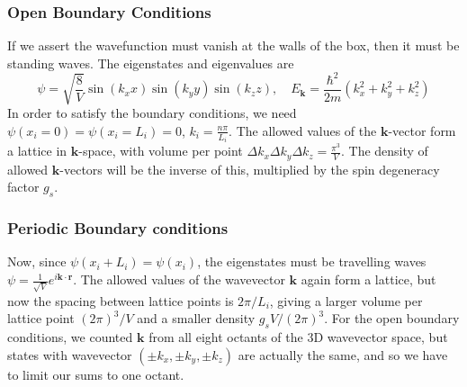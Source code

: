 \documentclass[a4paper]{article}
\theoremstyle{new}
\begin{document}
\subsubsection*{Open Boundary Conditions}
If we assert the wavefunction must vanish at the walls of the box, then it must be standing waves. The eigenstates and eigenvalues are
$$\psi=\sqrt{\frac{8}{V}}\sin(k_xx)\sin(k_yy)\sin(k_zz),\quad E_{\mathbf{k}}=\frac{\hbar^2}{2m}(k_x^2+k_y^2+k_z^2)$$
In order to satisfy the boundary conditions, we need $\psi(x_i=0)=\psi(x_i=L_i)=0$, $k_i=\frac{n\pi}{L_i}$. The allowed values of the $\mathbf{k}$-vector form a lattice in $\mathbf{k}$-space, with volume per point $\Delta k_x\Delta k_y\Delta k_z=\frac{\pi^3}{V}$. The density of allowed $\mathbf{k}$-vectors will be the inverse of this, multiplied by the spin degeneracy factor $g_s$.
\subsubsection*{Periodic Boundary conditions}
Now, since $\psi(x_i+L_i)=\psi(x_i)$, the eigenstates must be travelling waves $\psi=\frac{1}{\sqrt{V}}e^{i\mathbf{k}\cdot\mathbf{r}}$. The allowed values of the wavevector $\mathbf{k}$ again form a lattice, but now the spacing between lattice points is $2\pi/L_i$, giving a larger volume per lattice point $(2\pi)^3/V$ and a smaller density $g_sV/(2\pi)^3$. For the open boundary conditions, we counted $\mathbf{k}$ from all eight octants of the 3D wavevector space, but states with wavevector $(\pm k_x,\pm k_y,\pm k_z)$ are actually the same, and so we have to limit our sums to one octant.
\end{document}
